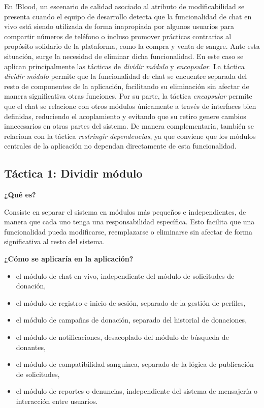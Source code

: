En !Blood, un escenario de calidad asociado al atributo de modificabilidad se presenta cuando el equipo de desarrollo detecta que la funcionalidad de chat en vivo está siendo utilizada de forma inapropiada por algunos usuarios para compartir números de teléfono o incluso promover prácticas contrarias al propósito solidario de la plataforma, como la compra y venta de sangre. Ante esta situación, surge la necesidad de eliminar dicha funcionalidad. En este caso se aplican principalmente las tácticas de \textit{dividir módulo} y \textit{encapsular}. La táctica \textit{dividir módulo} permite que la funcionalidad de chat se encuentre separada del resto de componentes de la aplicación, facilitando su eliminación sin afectar de manera significativa otras funciones. Por su parte, la táctica \textit{encapsular} permite que el chat se relacione con otros módulos únicamente a través de interfaces bien definidas, reduciendo el acoplamiento y evitando que su retiro genere cambios innecesarios en otras partes del sistema. De manera complementaria, también se relaciona con la táctica \textit{restringir dependencias}, ya que conviene que los módulos centrales de la aplicación no dependan directamente de esta funcionalidad.

\subsection{Táctica 1: Dividir módulo}

\noindent\textbf{¿Qué es?}

Consiste en separar el sistema en módulos más pequeños e independientes, de manera que cada uno tenga una responsabilidad específica. Esto facilita que una funcionalidad pueda modificarse, reemplazarse o eliminarse sin afectar de forma significativa al resto del sistema.

\medskip
\noindent\textbf{¿Cómo se aplicaría en la aplicación?}

\begin{itemize}
    \item el módulo de chat en vivo, independiente del módulo de solicitudes de donación,
    \item el módulo de registro e inicio de sesión, separado de la gestión de perfiles,
    \item el módulo de campañas de donación, separado del historial de donaciones,
    \item el módulo de notificaciones, desacoplado del módulo de búsqueda de donantes,
    \item el módulo de compatibilidad sanguínea, separado de la lógica de publicación de solicitudes,
    \item el módulo de reportes o denuncias, independiente del sistema de mensajería o interacción entre usuarios.
\end{itemize}

